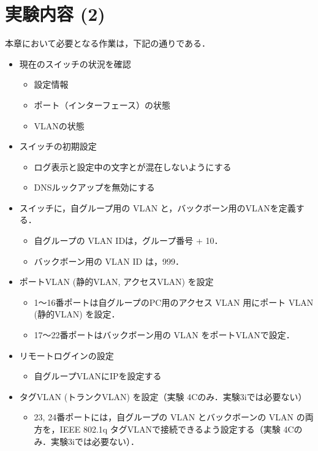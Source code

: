 \section{実験内容 (2)}
本章において必要となる作業は，下記の通りである．
\begin{itemize}
\item 現在のスイッチの状況を確認
    \begin{itemize}
    \item 設定情報
    \item ポート（インターフェース）の状態
    \item VLANの状態
    \end{itemize}
    
\item スイッチの初期設定
    \begin{itemize}
    \item ログ表示と設定中の文字とが混在しないようにする
    \item DNSルックアップを無効にする
    \end{itemize}
    
\item スイッチに，自グループ用の VLAN と，バックボーン用のVLANを定義する．
    \begin{itemize}
        \item 自グループの VLAN IDは，グループ番号 + 10．
        \item バックボーン用の VLAN ID は，999．
    \end{itemize}
    
\item ポートVLAN (静的VLAN, アクセスVLAN) を設定
    \begin{itemize}
        \item 1〜16番ポートは自グループのPC用のアクセス VLAN 用にポート VLAN (静的VLAN) を設定．
        \item 17〜22番ポートはバックボーン用の VLAN をポートVLANで設定．
    \end{itemize}
\item リモートログインの設定
    \begin{itemize}
        \item 自グループVLANにIPを設定する
    \end{itemize}
\item タグVLAN (トランクVLAN) を設定（実験 4Cのみ．実験3iでは必要ない）
    \begin{itemize}
        \item 23, 24番ポートには，自グループの VLAN とバックボーンの VLAN の両方を，IEEE 802.1q タグVLANで接続できるよう設定する（実験 4Cのみ．実験3iでは必要ない）．
    \end{itemize}


\end{itemize}

